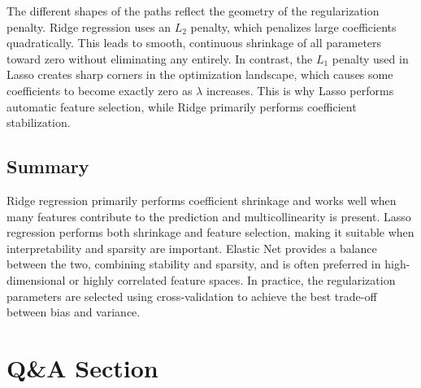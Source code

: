 \documentclass{article}
\begin{document}
The different shapes of the paths reflect the geometry of the regularization penalty. Ridge regression uses an $L_2$ penalty, which penalizes large coefficients quadratically. This leads to smooth, continuous shrinkage of all parameters toward zero without eliminating any entirely. In contrast, the $L_1$ penalty used in Lasso creates sharp corners in the optimization landscape, which causes some coefficients to become exactly zero as $\lambda$ increases. This is why Lasso performs automatic feature selection, while Ridge primarily performs coefficient stabilization.

\subsection*{Summary}

Ridge regression primarily performs coefficient shrinkage and works well when many features contribute to the prediction and multicollinearity is present. Lasso regression performs both shrinkage and feature selection, making it suitable when interpretability and sparsity are important. Elastic Net provides a balance between the two, combining stability and sparsity, and is often preferred in high-dimensional or highly correlated feature spaces. In practice, the regularization parameters are selected using cross-validation to achieve the best trade-off between bias and variance.

\section{Q\&A Section}
\end{document}

